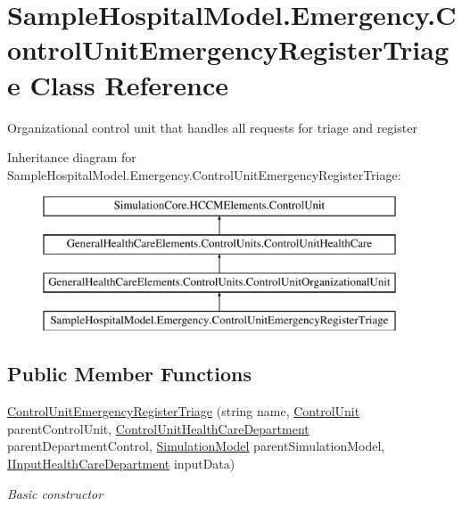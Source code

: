 \hypertarget{class_sample_hospital_model_1_1_emergency_1_1_control_unit_emergency_register_triage}{}\section{Sample\+Hospital\+Model.\+Emergency.\+Control\+Unit\+Emergency\+Register\+Triage Class Reference}
\label{class_sample_hospital_model_1_1_emergency_1_1_control_unit_emergency_register_triage}


Organizational control unit that handles all requests for triage and register  


Inheritance diagram for Sample\+Hospital\+Model.\+Emergency.\+Control\+Unit\+Emergency\+Register\+Triage\+:\begin{figure}[H]
\begin{center}
\leavevmode
\includegraphics[height=4.000000cm]{class_sample_hospital_model_1_1_emergency_1_1_control_unit_emergency_register_triage}
\end{center}
\end{figure}
\subsection*{Public Member Functions}
\begin{DoxyCompactItemize}
\item 
\hyperlink{class_sample_hospital_model_1_1_emergency_1_1_control_unit_emergency_register_triage_a45f59a940cce2021e8ae31c421559711}{Control\+Unit\+Emergency\+Register\+Triage} (string name, \hyperlink{class_simulation_core_1_1_h_c_c_m_elements_1_1_control_unit}{Control\+Unit} parent\+Control\+Unit, \hyperlink{class_general_health_care_elements_1_1_control_units_1_1_control_unit_health_care_department}{Control\+Unit\+Health\+Care\+Department} parent\+Department\+Control, \hyperlink{class_simulation_core_1_1_simulation_classes_1_1_simulation_model}{Simulation\+Model} parent\+Simulation\+Model, \hyperlink{interface_general_health_care_elements_1_1_input_1_1_i_input_health_care_department}{I\+Input\+Health\+Care\+Department} input\+Data)
\begin{DoxyCompactList}\small\item\em Basic constructor \end{DoxyCompactList}\end{DoxyCompactItemize}
